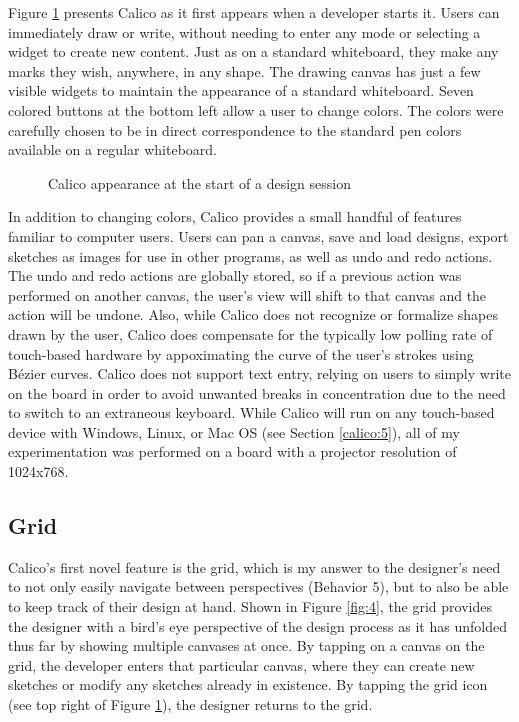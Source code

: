 \documentclass[12pt,fleqn]{ucithesis}
\begin{document}
Figure \ref{fig:3} presents Calico as it first appears when a developer starts it. Users can immediately draw or write, without needing to enter any mode or selecting a widget to create new content. Just as on a standard whiteboard, they make any marks they wish, anywhere, in any shape. The drawing canvas has just a few visible widgets to maintain the appearance of a standard whiteboard. Seven colored buttons at the bottom left allow a user to change colors. The colors were carefully chosen to be in direct correspondence to the standard pen colors available on a regular whiteboard.

\begin{figure}
  \centering
  \caption {Calico appearance at the start of a design session}
\label{fig:3}       %
\end{figure}
%

In addition to changing colors, Calico provides a small handful of features familiar to computer users. Users can pan a canvas, save and load designs, export sketches as images for use in other programs, as well as undo and redo actions. The undo and redo actions are globally stored, so if a previous action was performed on another canvas, the user's view will shift to that canvas and the action will be undone. Also, while Calico does not recognize or formalize shapes drawn by the user, Calico does compensate for the typically low polling rate of touch-based hardware by appoximating the curve of the user's strokes using B\'ezier curves. Calico does not support text entry, relying on users to simply write on the board in order to avoid unwanted breaks in concentration due to the need to switch to an extraneous keyboard. While Calico will run on any touch-based device with Windows, Linux, or Mac OS (see Section \ref{calico:5}), all of my experimentation was performed on a board with a projector
 resolution of 1024x768.

\subsection{Grid}
\label{calico:2}

Calico's first novel feature is the grid, which is my answer to the designer's need to not only easily navigate between perspectives (Behavior 5), but to also be able to keep track of their design at hand. Shown in Figure \ref{fig:4}, the grid provides the designer with a bird's eye perspective of the design process as it has unfolded thus far by showing multiple canvases at once. By tapping on a canvas on the grid, the developer enters that particular canvas, where they can create new sketches or modify any sketches already in existence. By tapping the grid icon (see top right of Figure \ref{fig:3}), the designer returns to the grid. 
\end{document}
